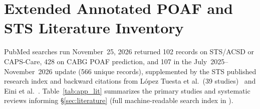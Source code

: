 \section{Extended Annotated POAF and STS Literature Inventory}
\label{app:literature}

PubMed searches run November~25, 2026 returned 102 records on STS/ACSD or CAPS-Care, 428 on CABG POAF prediction, and 107 in the July~2025--November~2026 update (566 unique records), supplemented by the STS published research index and backward citations from L{\'o}pez Tuesta et al.\ (39 studies)~\cite{lopeztuesta2026poaf} and Eini et al.~\cite{eini2026cabg}. Table~\ref{tab:app_lit} summarizes the primary studies and systematic reviews informing \S\ref{sec:literature} (full machine-readable search index in ).

